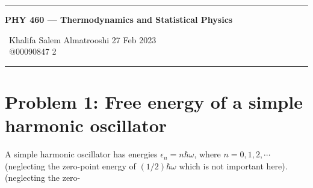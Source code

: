 \documentclass{article}
\begin{document}
	
	\begin{center}
		\hrule
		\vspace{0.4cm}
		\textbf { \large PHY 460 --- Thermodynamics and Statistical Physics}
		\vspace{0.4cm}
	\end{center}
		 \ Khalifa Salem Almatrooshi \hspace{\fill}  27 Feb 2023 \\
		 \ @00090847 \hspace{\fill}  2 \\
		\hrule	
	
	\section[Problem 1]{Problem 1: Free energy of a simple harmonic oscillator}
	A simple harmonic oscillator has energies $\epsilon_n = n\hbar\omega$, where $n=0,1,2,\cdots$ (neglecting the zero-point energy of $(1/2)\hbar\omega$ which is not important here).
	(neglecting the zero-
\end{document}
